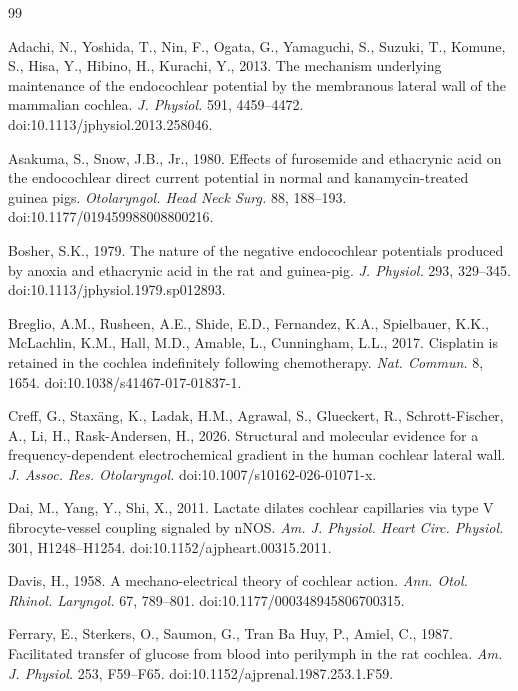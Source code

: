 \documentclass[final,5p,times]{elsarticle}
\begin{document}
\clearpage
\twocolumn
\begin{thebibliography}{99}

Adachi, N., Yoshida, T., Nin, F., Ogata, G., Yamaguchi, S., Suzuki, T., Komune, S., Hisa, Y., Hibino, H., Kurachi, Y., 2013. The mechanism underlying maintenance of the endocochlear potential by the membranous lateral wall of the mammalian cochlea. \emph{J. Physiol.} 591, 4459--4472. doi:10.1113/jphysiol.2013.258046.

Asakuma, S., Snow, J.B., Jr., 1980. Effects of furosemide and ethacrynic acid on the endocochlear direct current potential in normal and kanamycin-treated guinea pigs. \emph{Otolaryngol. Head Neck Surg.} 88, 188--193. doi:10.1177/019459988008800216.

Bosher, S.K., 1979. The nature of the negative endocochlear potentials produced by anoxia and ethacrynic acid in the rat and guinea-pig. \emph{J. Physiol.} 293, 329--345. doi:10.1113/jphysiol.1979.sp012893.

Breglio, A.M., Rusheen, A.E., Shide, E.D., Fernandez, K.A., Spielbauer, K.K., McLachlin, K.M., Hall, M.D., Amable, L., Cunningham, L.L., 2017. Cisplatin is retained in the cochlea indefinitely following chemotherapy. \emph{Nat. Commun.} 8, 1654. doi:10.1038/s41467-017-01837-1.

Creff, G., Staxäng, K., Ladak, H.M., Agrawal, S., Glueckert, R., Schrott-Fischer, A., Li, H., Rask-Andersen, H., 2026. Structural and molecular evidence for a frequency-dependent electrochemical gradient in the human cochlear lateral wall. \emph{J. Assoc. Res. Otolaryngol.} doi:10.1007/s10162-026-01071-x.

Dai, M., Yang, Y., Shi, X., 2011. Lactate dilates cochlear capillaries via type V fibrocyte-vessel coupling signaled by nNOS. \emph{Am. J. Physiol. Heart Circ. Physiol.} 301, H1248--H1254. doi:10.1152/ajpheart.00315.2011.

Davis, H., 1958. A mechano-electrical theory of cochlear action. \emph{Ann. Otol. Rhinol. Laryngol.} 67, 789--801. doi:10.1177/000348945806700315.

Ferrary, E., Sterkers, O., Saumon, G., Tran Ba Huy, P., Amiel, C., 1987. Facilitated transfer of glucose from blood into perilymph in the rat cochlea. \emph{Am. J. Physiol.} 253, F59--F65. doi:10.1152/ajprenal.1987.253.1.F59.


\end{thebibliography}
\end{document}
